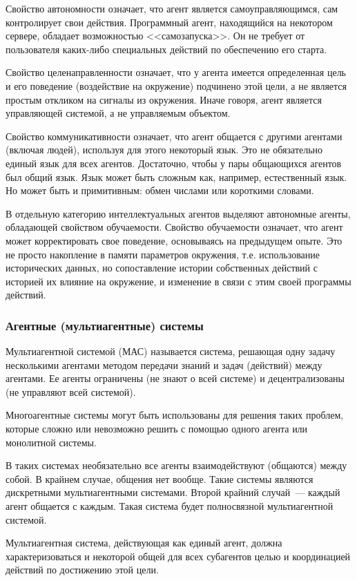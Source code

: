Свойство автономности означает, что агент является самоуправляющимся, сам контролирует свои действия. Программный агент, находящийся на некотором сервере, обладает возможностью <<самозапуска>>. Он не требует от пользователя каких-либо специальных действий по обеспечению его старта.

Свойство целенаправленности означает, что у агента имеется определенная цель и его поведение (воздействие на окружение) подчинено этой цели, а не является простым откликом на сигналы из окружения. Иначе говоря, агент является управляющей системой, а не управляемым объектом.

Свойство коммуникативности означает, что агент общается с другими агентами (включая людей), используя для этого некоторый язык. Это не обязательно единый язык для всех агентов. Достаточно, чтобы у пары общающихся агентов был общий язык. Язык может быть сложным как, например, естественный язык. Но может быть и примитивным: обмен числами или короткими словами.

В отдельную категорию интеллектуальных агентов выделяют автономные агенты, обладающей свойством обучаемости. Свойство обучаемости означает, что агент может корректировать свое поведение, основываясь на предыдущем опыте. Это не просто накопление в памяти параметров окружения, т.е. использование исторических данных, но сопоставление истории собственных действий с историей их влияние на окружение, и изменение в связи с этим своей программы действий.

\subsubsection{Агентные (мультиагентные) системы}
Мультиагентной системой (МАС) называется система, решающая одну задачу несколькими агентами методом передачи знаний и задач (действий) между агентами. Ее агенты ограничены (не знают о всей системе) и децентрализованы (не управляют всей системой).

Многоагентные системы могут быть использованы для решения таких проблем, которые сложно или невозможно решить с помощью одного агента или монолитной системы.

В таких системах необязательно все агенты взаимодействуют (общаются) между собой. В крайнем случае, общения нет вообще. Такие системы являются дискретными мультиагентными системами. Второй крайний случай~--- каждый агент общается с каждым. Такая система будет полносвязной мультиагентной системой.

Мультиагентная система, действующая как единый агент, должна характеризоваться и некоторой общей для всех субагентов целью и координацией действий по достижению этой цели.

